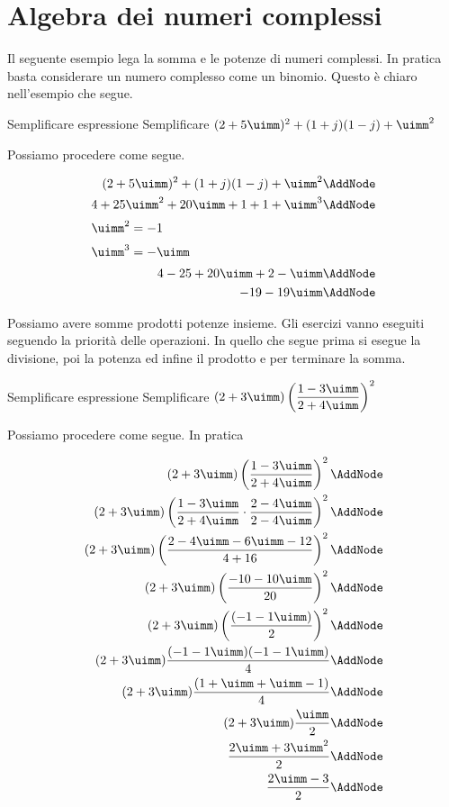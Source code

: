 \section{Algebra dei numeri complessi}
\label{sec:AlgebraNumeriComplessi}
Il seguente esempio lega la somma e le potenze di numeri complessi. In pratica basta considerare un numero complesso come un binomio. Questo è chiaro nell'esempio che segue.
\begin{esempiot}{Semplificare espressione}{}
Semplificare $(2+5\uimm)^2+(1+j)(1-j)+\uimm^2 $ 
\end{esempiot}
Possiamo procedere come segue.
	\begin{NodesList} [margin=4cm]
		\begin{align*}
			(2+5\uimm)^2+(1+j)(1-j)+\uimm^2 \AddNode\\
			4+25\uimm^2+20\uimm+1+1+\uimm^3\AddNode\\
			\intertext{\hfil $\uimm^2=-1$}
			\intertext{\hfil $\uimm^3=-\uimm$}
			4-25+20\uimm+2-\uimm\AddNode\\
			-19-19\uimm\AddNode
		\end{align*}
	\end{NodesList}
Possiamo avere somme prodotti potenze insieme. Gli esercizi vanno eseguiti seguendo la priorità delle operazioni. In quello che segue  prima si esegue la divisione, poi la potenza ed infine il prodotto e per terminare la somma. 
\begin{esempiot}{Semplificare espressione}{}
Semplificare $(2+3\uimm)\left(\dfrac{1-3\uimm}{2+4\uimm}\right)^2 $
\end{esempiot}
 Possiamo procedere come segue. In pratica
	\begin{NodesList} [margin=4cm]
		\begin{align*}
			(2+3\uimm)\left(\dfrac{1-3\uimm}{2+4\uimm}\right)^2 \AddNode\\
			(2+3\uimm)\left(\dfrac{1-3\uimm}{2+4\uimm}\cdot\dfrac{2-4\uimm}{2-4\uimm}\right)^2\AddNode\\
			(2+3\uimm)\left(\dfrac{2-4\uimm-6\uimm-12}{4+16}\right)^2\AddNode\\
			(2+3\uimm)\left(\dfrac{-10-10\uimm}{20}\right)^2\AddNode\\
			(2+3\uimm)\left(\dfrac{(-1-1\uimm)}{2}\right)^2\AddNode\\
			(2+3\uimm)\dfrac{(-1-1\uimm)(-1-1\uimm)}{4}\AddNode\\
			(2+3\uimm)\dfrac{(1+\uimm+\uimm-1)}{4}\AddNode\\
			(2+3\uimm)\dfrac{\uimm}{2}\AddNode\\
			\dfrac{2\uimm+3\uimm^2}{2}\AddNode\\
			\dfrac{2\uimm-3}{2}\AddNode
		\end{align*}
	\end{NodesList}

